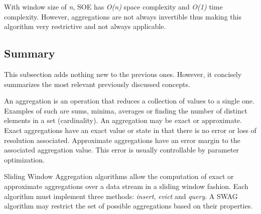 With window size of \textit{n}, SOE has \textit{O(n)} space complexity and \textit{O(1)} time complexity. However, aggregations are not always invertible thus making this algorithm very restrictive and not always applicable.

\subsection{Summary}
This subsection adds nothing new to the previous ones. However, it concisely summarizes the most relevant previously discussed concepts. 

An aggregation is an operation that reduces a collection of values to a single one. Examples of such are sums, minima, averages or finding the number of distinct elements in a set (cardinality). An aggregation may be exact or approximate. Exact aggregations have an exact value or state in that there is no error or loss of resolution associated. Approximate aggregations have an error margin to the associated aggregation value. This error is usually controllable by parameter optimization.

Sliding Window Aggregation algorithms allow the computation of exact or approximate aggregations over a data stream in a sliding window fashion. Each algorithm must implement three methods: \textit{insert}, \textit{evict} and \textit{query}. A SWAG algorithm may restrict the set of possible aggregations based on their properties.



